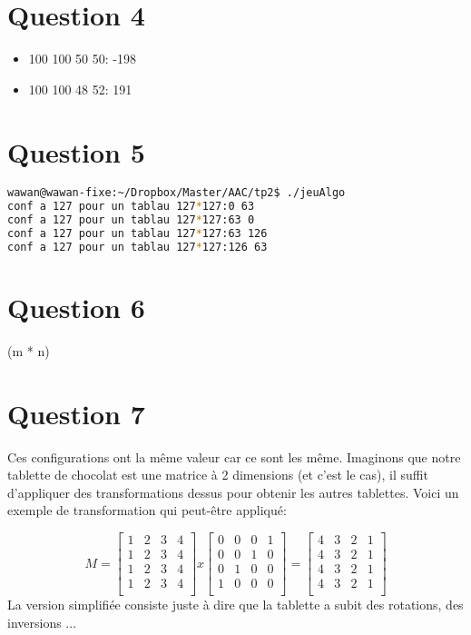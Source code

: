 \documentclass[a4paper,12pt]{report}
\begin{document}
\section*{Question 4}
\begin{itemize}
	\item 100 100 50 50: -198
	\item 100 100 48 52: 191
\end{itemize}

\newpage

\section*{Question 5}
\begin{lstlisting}[language=bash]
wawan@wawan-fixe:~/Dropbox/Master/AAC/tp2$ ./jeuAlgo
conf a 127 pour un tablau 127*127:0 63 
conf a 127 pour un tablau 127*127:63 0 
conf a 127 pour un tablau 127*127:63 126 
conf a 127 pour un tablau 127*127:126 63 
\end{lstlisting}

\section*{Question 6}
(m * n)

\section*{Question 7}
Ces configurations ont la même valeur car ce sont les même. Imaginons que notre tablette de chocolat est une matrice à 2 dimensions (et c'est le cas), il suffit d'appliquer des transformations dessus pour obtenir les autres tablettes. Voici un exemple de transformation qui peut-être appliqué:

\[
M=
  \begin{bmatrix}
    1 & 2 & 3 & 4 \\
    1 & 2 & 3 & 4 \\
    1 & 2 & 3 & 4 \\
    1 & 2 & 3 & 4 \\
  \end{bmatrix} x
  \begin{bmatrix}
    0 & 0 & 0 & 1 \\
    0 & 0 & 1 & 0 \\
    0 & 1 & 0 & 0 \\
    1 & 0 & 0 & 0 \\
  \end{bmatrix} =
  \begin{bmatrix}
    4 & 3 & 2 & 1 \\
    4 & 3 & 2 & 1 \\
    4 & 3 & 2 & 1 \\
    4 & 3 & 2 & 1 \\
  \end{bmatrix}
\]
La version simplifiée consiste juste à dire que la tablette a subit des rotations, des inversions ...
\end{document}
